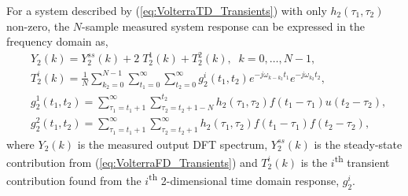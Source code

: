 \begin{thm}
\label{thm:2ndOrderResponse_Transients}
For a system described by (\ref{eq:VolterraTD_Transients}) with only $h_2(\tau_1,\tau_2)$ non-zero, the $N$-sample measured system response can be expressed in the frequency domain as, 
\begin{equation}
\begin{aligned}
\label{eq:2ndOrderResponse_Transients}
&Y_2(k) = Y_2^{ss}(k) + 2 \; T_2^1(k) + T_2^2(k),  \; \; k = 0,\hdots,N-1,\\
&T_2^i(k) = \frac{1}{N} \sum_{k_2=0}^{N-1} \sum_{t_1=0}^{\infty} \sum_{t_2=0}^{\infty} g_2^i(t_1,t_2) e^{-j \omega_{k-k_2}t_1} e^{-j \omega_{k_2} t_2},\\
&g_2^1(t_1,t_2) = \sum_{\tau_1=t_1+1}^{\infty} \sum_{\tau_2=t_2+1-N}^{t_2} h_2(\tau_1,\tau_2) f(t_1-\tau_1) u(t_2-\tau_2),\\
&g_2^2(t_1,t_2) = \sum_{\tau_1=t_1+1}^{\infty} \sum_{\tau_2=t_2+1}^{\infty} h_2(\tau_1,\tau_2) f(t_1-\tau_1) f(t_2-\tau_2),
\end{aligned}
\end{equation}
where $Y_2(k)$ is the measured output DFT spectrum, $Y_2^{ss}(k)$ is the steady-state contribution from (\ref{eq:VolterraFD_Transients}) and $T_2^i(k)$ is the $i$\textsuperscript{th} transient contribution found from the $i$\textsuperscript{th} 2-dimensional time domain response, $g_2^i$.
\end{thm}
